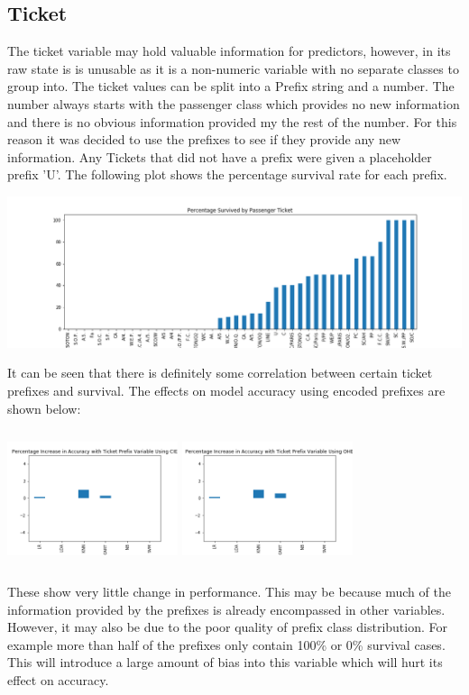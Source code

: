 \documentclass{article}
\begin{document}
\subsection{Ticket}
The ticket variable may hold valuable information for predictors, however, in its raw state is is unusable as it is a non-numeric variable with no separate classes to group into. The ticket values can be split into a Prefix string and a number. The number always starts with the passenger class which provides no new information and there is no obvious information provided my the rest of the number. For this reason it was decided to use the prefixes to see if they provide any new information. Any Tickets that did not have a prefix were given a placeholder prefix 'U'. The following plot shows the percentage survival rate for each prefix.
\par
\includegraphics[width=\textwidth]{Percentage_Survived_by_Passenger_Ticket}
\par
It can be seen that there is definitely some correlation between certain ticket prefixes and survival. The effects on model accuracy using encoded prefixes are shown below:
\par
\includegraphics[width=5cm, height=4cm]{Percentage_Increase_in_Accuracy_with_Ticket_Prefix_Variable_Using_CIE}
\includegraphics[width=5cm, height=4cm]{Percentage_Increase_in_Accuracy_with_Ticket_Prefix_Variable_Using_OHE}
\par
These show very little change in performance. This may be because much of the information provided by the prefixes is already encompassed in other variables. However, it may also be due to the poor quality of prefix class distribution. For example more than half of the prefixes only contain 100\% or 0\% survival cases. This will introduce a large amount of bias into this variable which will hurt its effect on accuracy.
\end{document}
